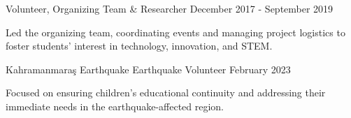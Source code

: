 \begin{cventries}
\cventry
    {\href{https://www.sciencetravellers.com/}{}} %
    {Volunteer, Organizing Team \& Researcher} %
    {} %
    {December 2017 - September 2019} %
    {
      \begin{cvitems} %
        \item {Led the organizing team, coordinating events and managing project logistics to foster students' interest in technology, innovation, and STEM.}
      \end{cvitems}
    }

  \cventry
    {Kahramanmaraş Earthquake} %
    {Earthquake Volunteer} %
    {} %
    {February 2023} %
    {
      \begin{cvitems} %
        \item {Focused on ensuring children's educational continuity and addressing their immediate needs in the earthquake-affected region.}
      \end{cvitems}
    }

\end{cventries}